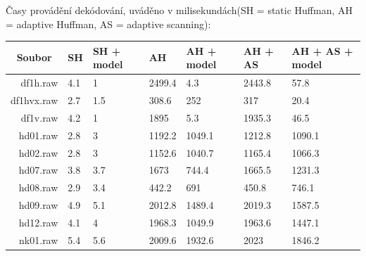 \documentclass[12pt,a4paper,titlepage,final]{report}
\begin{document}
Časy provádění dekódování, uváděno v milisekundách(SH = static Huffman, AH = adaptive Huffman, AS = adaptive scanning):
\begin{table}[H]
\begin{tabular}{|r|l|l|l|l|l|l|}
\hline
\multicolumn{1}{|c|}{Soubor} & SH  & SH + model & AH     & AH + model & AH + AS & AH + AS + model \\ \hline
df1h.raw                     & 4.1 & 1          & 2499.4 & 4.3        & 2443.8  & 57.8            \\ \hline
df1hvx.raw                   & 2.7 & 1.5        & 308.6  & 252        & 317     & 20.4            \\ \hline
df1v.raw                     & 4.2 & 1          & 1895   & 5.3        & 1935.3  & 46.5            \\ \hline
hd01.raw                     & 2.8 & 3          & 1192.2 & 1049.1     & 1212.8  & 1090.1          \\ \hline
hd02.raw                     & 2.8 & 3          & 1152.6 & 1040.7     & 1165.4  & 1066.3          \\ \hline
hd07.raw                     & 3.8 & 3.7        & 1673   & 744.4      & 1665.5  & 1231.3          \\ \hline
hd08.raw                     & 2.9 & 3.4        & 442.2  & 691        & 450.8   & 746.1           \\ \hline
hd09.raw                     & 4.9 & 5.1        & 2012.8 & 1489.4     & 2019.3  & 1587.5          \\ \hline
hd12.raw                     & 4.1 & 4          & 1968.3 & 1049.9     & 1963.6  & 1447.1          \\ \hline
nk01.raw                     & 5.4 & 5.6        & 2009.6 & 1932.6     & 2023    & 1846.2          \\ \hline
\end{tabular}
\end{table}
\end{document}
